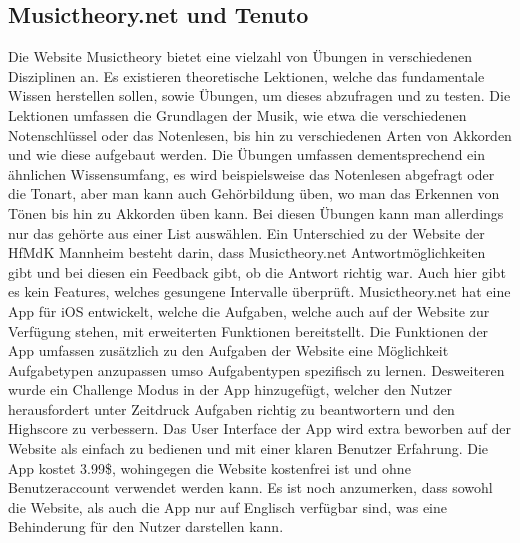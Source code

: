 \subsection*{Musictheory.net und Tenuto}
\label{sec:Musictheory.net} \label{sec:Tenuto}
Die Website Musictheory bietet eine vielzahl von Übungen in verschiedenen Disziplinen an. Es existieren theoretische Lektionen, welche das fundamentale Wissen herstellen sollen, sowie Übungen, um dieses abzufragen und zu testen. 
Die Lektionen umfassen die Grundlagen der Musik, wie etwa die verschiedenen Notenschlüssel oder das Notenlesen, bis hin zu verschiedenen Arten von Akkorden und wie diese aufgebaut werden. Die Übungen umfassen dementsprechend ein ähnlichen 
Wissensumfang, es wird beispielsweise das Notenlesen abgefragt oder die Tonart, aber man kann auch Gehörbildung üben, wo man das Erkennen von Tönen bis hin zu Akkorden üben kann. Bei diesen Übungen kann man
allerdings nur das gehörte aus einer List auswählen. Ein Unterschied zu der Website der HfMdK Mannheim besteht darin, dass Musictheory.net Antwortmöglichkeiten gibt und bei diesen ein Feedback gibt, ob 
die Antwort richtig war. Auch hier gibt es kein Features, welches gesungene Intervalle überprüft. Musictheory.net hat eine App für iOS entwickelt, welche die Aufgaben, welche auch auf der Website zur Verfügung stehen,
mit erweiterten Funktionen bereitstellt. Die Funktionen der App umfassen zusätzlich zu den Aufgaben der Website eine Möglichkeit Aufgabetypen anzupassen umso Aufgabentypen spezifisch zu lernen. Desweiteren wurde ein Challenge Modus in der 
App hinzugefügt, welcher den Nutzer herausfordert unter Zeitdruck Aufgaben richtig zu beantwortern und den Highscore zu verbessern. Das User Interface der App wird extra beworben auf der Website als einfach zu bedienen und mit einer klaren Benutzer Erfahrung. 
Die App kostet 3.99\$, wohingegen die Website kostenfrei ist und ohne Benutzeraccount verwendet werden kann. Es ist noch anzumerken, dass sowohl die Website, als auch die App nur auf Englisch verfügbar sind, was eine Behinderung für den Nutzer darstellen kann. \cite{musictheory}

